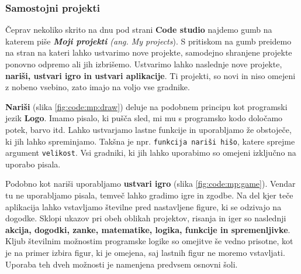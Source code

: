 \subsubsection{Samostojni projekti}
\label{sec:gradnja-projektov}

Čeprav nekoliko skrito na dnu pod strani \textbf{Code studio} najdemo
gumb na katerem piše \emph{\textbf{Moji projekti} (ang. My
  projects}). S pritiskom na gumb preidemo na stran na kateri lahko
ustvarimo nove projekte, samodejno shranjene projekte ponovno odpremo
ali jih izbrišemo. Ustvarimo lahko naslednje nove projekte,
\textbf{nariši, ustvari igro in ustvari aplikacije}. Ti projekti, so
novi in niso omejeni z nobeno vsebino, zato imajo na voljo vse
gradnike.

\textbf{Nariši} (slika \ref{fig:code:mp:draw}) deluje na podobnem
principu kot programski jezik \textbf{Logo}. Imamo pisalo, ki pušča
sled, mi mu s programsko kodo določamo potek, barvo itd. Lahko
ustvarjamo lastne funkcije in uporabljamo že obstoječe, ki jih lahko
spreminjamo. Takšna je npr. \texttt{funkcija nariši hišo}, katere
sprejme argument \texttt{velikost}. Vsi gradniki, ki jih lahko
uporabimo so omejeni izključno na uporabo pisala. 

Podobno kot nariši uporabljamo \textbf{ustvari igro} (slika
\ref{fig:code:mp:game}). Vendar tu ne uporabljamo pisala, temveč lahko
gradimo igre in zgodbe. Na del kjer teče aplikacija lahko vstavljamo
številne pred nastavljene figure, ki se odzivajo na dogodke. Sklopi
ukazov pri obeh oblikah projektov, risanja in iger so naslednji
\textbf{akcija, dogodki, zanke, matematike, logika, funkcije in
  spremenljivke}. Kljub številnim možnostim programske logike so
omejitve še vedno prisotne, kot je na primer izbira figur, ki je
omejena, saj lastnih figur ne moremo vstavljati. Uporaba teh dveh
možnosti je namenjena predvsem osnovni šoli.

